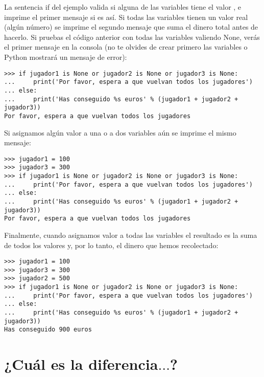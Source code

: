 La sentencia if del ejemplo valida si alguna de las variables tiene el valor , e imprime el primer mensaje si es así.  Si todas las variables tienen un valor real (algún número) se imprime el segundo mensaje que suma el dinero total antes de hacerlo.   Si pruebas el código anterior con todas las variables valiendo None, verás el primer mensaje en la consola (no te olvides de crear primero las variables o Python mostrará un mensaje de error): 

\begin{listing}
\begin{verbatim}
>>> if jugador1 is None or jugador2 is None or jugador3 is None:
...     print('Por favor, espera a que vuelvan todos los jugadores')
... else:
...     print('Has conseguido %s euros' % (jugador1 + jugador2 + jugador3))
Por favor, espera a que vuelvan todos los jugadores
\end{verbatim}
\end{listing}

Si asignamos algún valor a una o a dos variables aún se imprime el mismo mensaje:

\begin{listing}
\begin{verbatim}
>>> jugador1 = 100
>>> jugador3 = 300
>>> if jugador1 is None or jugador2 is None or jugador3 is None:
...     print('Por favor, espera a que vuelvan todos los jugadores')
... else:
...     print('Has conseguido %s euros' % (jugador1 + jugador2 + jugador3))
Por favor, espera a que vuelvan todos los jugadores
\end{verbatim}
\end{listing}

\noindent
Finalmente, cuando asignamos valor a todas las variables el resultado es la suma de todos los valores y, por lo tanto, el dinero que hemos recolectado:

\begin{listing}
\begin{verbatim}
>>> jugador1 = 100
>>> jugador3 = 300
>>> jugador2 = 500
>>> if jugador1 is None or jugador2 is None or jugador3 is None:
...     print('Por favor, espera a que vuelvan todos los jugadores')
... else:
...     print('Has conseguido %s euros' % (jugador1 + jugador2 + jugador3))
Has conseguido 900 euros
\end{verbatim}
\end{listing}

\section{¿Cuál es la diferencia$\ldots$?}\label{whatsthedifference}

